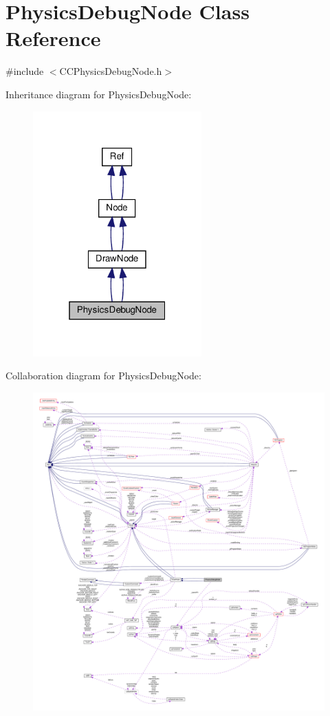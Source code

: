\hypertarget{classPhysicsDebugNode}{}\section{Physics\+Debug\+Node Class Reference}
\label{classPhysicsDebugNode}


{\ttfamily \#include $<$C\+C\+Physics\+Debug\+Node.\+h$>$}



Inheritance diagram for Physics\+Debug\+Node\+:
\nopagebreak
\begin{figure}[H]
\begin{center}
\leavevmode
\includegraphics[width=184pt]{classPhysicsDebugNode__inherit__graph}
\end{center}
\end{figure}


Collaboration diagram for Physics\+Debug\+Node\+:
\nopagebreak
\begin{figure}[H]
\begin{center}
\leavevmode
\includegraphics[width=350pt]{classPhysicsDebugNode__coll__graph}
\end{center}
\end{figure}
